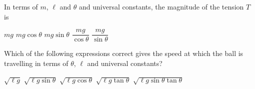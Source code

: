 \documentclass{../../../oss-apphys-exam}
\begin{document}
\begin{questions}
\begin{oneparchoices}
    \choice
  \end{oneparchoices}
  \label{ball1}
    
  \question In terms of $m$, $\ell$ and $\theta$ and universal constants, the
  magnitude of the tension $T$ is
  \begin{choices}
    \choice $mg$
    \choice $mg\cos\theta$
    \choice $mg\sin\theta$
    \correctchoice $\dfrac{mg}{\cos\theta}$
    \choice $\dfrac{mg}{\sin\theta}$
  \end{choices}
    
  \question Which of the following expressions correct gives the speed at which
  the ball is travelling in terms of $\theta$, $\ell$ and universal constants?
  \label{conical2}
  \begin{choices}
    \choice $\sqrt{\ell g}$
    \choice $\sqrt{\ell g\sin\theta}$
    \choice $\sqrt{\ell g\cos\theta}$
    \choice $\sqrt{\ell g\tan\theta}$
    \choice $\sqrt{\ell g\sin\theta\tan\theta}$
  \end{choices}


\end{questions}
\end{document}
